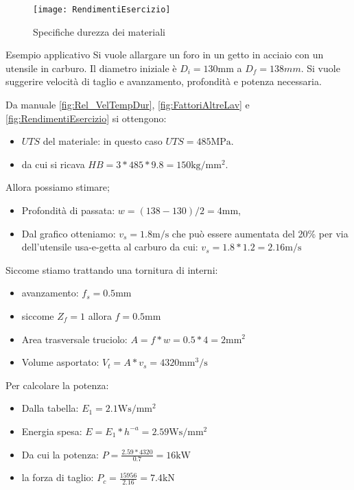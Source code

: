 \begin{figure}
\centering
\texttt{[image: RendimentiEsercizio]}
\caption{Specifiche durezza dei materiali}
\label{fig:RendimentiEsercizio}
\end{figure}

\begin{example}{Esempio applicativo}
Si vuole allargare un foro in un getto in acciaio con un utensile in carburo. Il diametro iniziale è $D_i = 130\unit{\mm}$ a $D_f = 138\unit{mm}$. Si vuole suggerire velocità di taglio e avanzamento, profondità e potenza necessaria.

Da manuale \eqref{fig:Rel_VelTempDur}, \eqref{fig:FattoriAltreLav} e \eqref{fig:RendimentiEsercizio} si ottengono: 
\begin{itemize}
\item $UTS$ del materiale: in questo caso $UTS = 485\unit{\MPa}$.
\item da cui si ricava $HB = 3*485*9.8=150\unit{\kg/\mm^2}$.
\end{itemize}
Allora possiamo stimare;
\begin{itemize}
\item Profondità di passata: $w = (138-130)/2 = 4\unit{\mm}$,
\item Dal grafico otteniamo: $v_s = 1.8\unit{\m/\s}$ che può essere aumentata del 20\% per via dell'utensile usa-e-getta al carburo da cui: $v_s = 1.8 * 1.2 = 2.16\unit{\m/\s}$
\end{itemize}
Siccome stiamo trattando una tornitura di interni:
\begin{itemize}
\item avanzamento: $f_s = 0.5\unit{\mm}$
\item siccome $Z_f = 1$ allora $f = 0.5\unit{\mm}$
\item Area trasversale truciolo: $A = f*w = 0.5*4 = 2\unit{\mm^2}$
\item Volume asportato: $V_t = A * v_s = 4320\unit{\mm^3/\s}$
\end{itemize}
Per calcolare la potenza:
\begin{itemize}
\item Dalla tabella: $E_1 = 2.1\unit{\W\s/\mm^2}$
\item Energia spesa: $E = E_1 * h^{-a}= 2.59\unit{\W\s/\mm^2}$
\item Da cui la potenza: $P = \frac{2.59 * 4320}{0.7} = 16\unit{\kW}$
\item la forza di taglio: $P_c = \frac{15956}{2.16} = 7.4\unit{\kN}$
\end{itemize}
\end{example}

